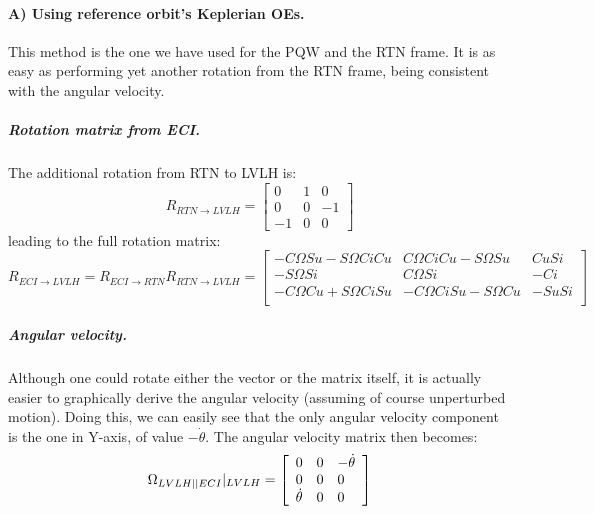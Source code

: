 		\paragraph{A) Using reference orbit's Keplerian OEs. \\}
		\indent This method is the one we have used for the PQW and the RTN frame. It is as easy as performing yet another rotation from the RTN frame, being consistent with the angular velocity.
			\subparagraph{Rotation matrix from ECI. \\}
			\indent The additional rotation from RTN to LVLH is:
			\[
			R_{RTN\to LVLH} = \left[ \begin{array}{lll}
			0 			& 1 	& 0 \\
			0		    & 0 			& -1 \\
			-1 			& 0 			& 0
			\end{array}\right]
			\]
			\noindent leading to the full rotation matrix:
			\[
			R_{ECI\to LVLH} = R_{ECI\to RTN} R_{RTN\to LVLH} = \left[ \begin{array}{lll}
			-C\Omega S u - S\Omega C i C u 			& C\Omega C i C u - S\Omega S u		& C u S i\\
			-S\Omega S i		    				& C\Omega S i 						& -C i \\
			-C\Omega C u + S\Omega C i S u 			& -C\Omega C i S u - S\Omega C u	& -S u S i\\
			\end{array}\right]
			\]
			\subparagraph{Angular velocity. \\}
			\indent Although one could rotate either the vector or the matrix itself, it is actually easier to graphically derive the angular velocity (assuming of course unperturbed motion). Doing this, we can easily see that the only angular velocity component is the one in Y-axis, of value $-\dot{\theta}$. The angular velocity matrix then becomes:
			\[
			\Omega_{LVLH\vert \vert ECI}\rvert_{LVLH} = \left[ \begin{array}{lll}
			0 			& 0 			& -\dot{\theta}\\
			0 			& 0 			& 0 \\
			\dot{\theta}	& 0 			& 0
			\end{array}\right]
			\]
